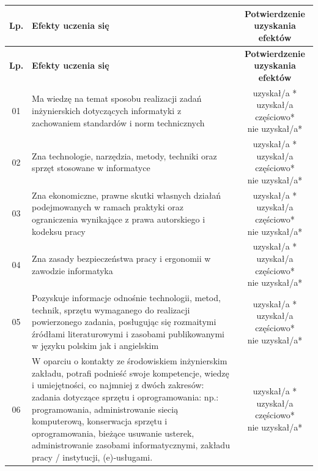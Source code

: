 \documentclass[11pt,a4paper]{article}
\begin{document}
\renewcommand{\arraystretch}{1.5}
\begin{longtable}{|c|p{10cm}|c|}
\hline
\textbf{Lp.} & \textbf{Efekty uczenia się} & \textbf{Potwierdzenie uzyskania efektów} \\ \hline
\endfirsthead
\hline
\textbf{Lp.} & \textbf{Efekty uczenia się} & \textbf{Potwierdzenie uzyskania efektów} \\ \hline
\endhead

01 & Ma wiedzę na temat sposobu realizacji zadań inżynierskich dotyczących informatyki z zachowaniem standardów i norm technicznych & \makecell{uzyskał/a *\\ uzyskał/a częściowo*\\ nie uzyskał/a*} \\ \hline
02 & Zna technologie, narzędzia, metody, techniki oraz sprzęt stosowane w informatyce & \makecell{uzyskał/a *\\ uzyskał/a częściowo*\\ nie uzyskał/a*} \\ \hline
03 & Zna ekonomiczne, prawne skutki własnych działań podejmowanych w ramach praktyki oraz ograniczenia wynikające z prawa autorskiego i kodeksu pracy & \makecell{uzyskał/a *\\ uzyskał/a częściowo*\\ nie uzyskał/a*} \\ \hline
04 & Zna zasady bezpieczeństwa pracy i ergonomii w zawodzie informatyka & \makecell{uzyskał/a *\\ uzyskał/a częściowo*\\ nie uzyskał/a*} \\ \hline
05 & Pozyskuje informacje odnośnie technologii, metod, technik, sprzętu wymaganego do realizacji powierzonego zadania, posługując się rozmaitymi źródłami literaturowymi i zasobami publikowanymi w języku polskim jak i angielskim & \makecell{uzyskał/a *\\ uzyskał/a częściowo*\\ nie uzyskał/a*} \\ \hline
06 & W oparciu o kontakty ze środowiskiem inżynierskim zakładu, potrafi podnieść swoje kompetencje, wiedzę i umiejętności, co najmniej z dwóch zakresów: zadania dotyczące sprzętu i oprogramowania: np.: programowania, administrowanie siecią komputerową, konserwacja sprzętu i oprogramowania, bieżące usuwanie usterek, administrowanie zasobami informatycznymi, zakładu pracy / instytucji, (e)‑usługami. & \makecell{uzyskał/a *\\ uzyskał/a częściowo*\\ nie uzyskał/a*} \\ \hline

\end{longtable}
\end{document}
